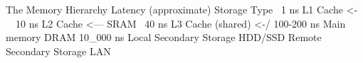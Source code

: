 \begin{verbatim*}
The Memory Hierarchy
Latency (approximate)                                            Storage Type    
~1 ns                    L1 Cache                               <-\
~10 ns                   L2 Cache                               <--- SRAM
~40 ns                   L3 Cache (shared)                      <-/   
100-200 ns               Main memory                            DRAM
10_000 ns                Local Secondary Storage                HDD/SSD
                         Remote Secondary Storage               LAN
\end{verbatim*}
